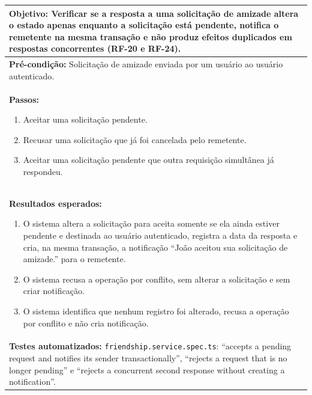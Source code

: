 \FloatBarrier
\begin{quadro}[h!]
\caption{Caso de teste CT07: validar a resposta a uma solicitação de amizade}
\label{quad:ct07}
\begin{tabular}{|p{\dimexpr\linewidth-2\tabcolsep-2\arrayrulewidth\relax}|}
\hline
\textbf{Objetivo:} Verificar se a resposta a uma solicitação de amizade altera o estado apenas enquanto a solicitação está pendente, notifica o remetente na mesma transação e não produz efeitos duplicados em respostas concorrentes (RF-20 e RF-24). \\ \hline
\textbf{Pré-condição:} Solicitação de amizade enviada por um usuário ao usuário autenticado. \\ \hline
\textbf{Passos:}
\begin{enumerate}[nosep,leftmargin=1.2em,topsep=2pt,partopsep=0pt,parsep=0pt,itemsep=1pt]
  \item Aceitar uma solicitação pendente.
  \item Recusar uma solicitação que já foi cancelada pelo remetente.
  \item Aceitar uma solicitação pendente que outra requisição simultânea já respondeu.
\end{enumerate} \\ \hline
\textbf{Resultados esperados:}
\begin{enumerate}[nosep,leftmargin=1.2em,topsep=2pt,partopsep=0pt,parsep=0pt,itemsep=1pt]
  \item O sistema altera a solicitação para aceita somente se ela ainda estiver pendente e destinada ao usuário autenticado, registra a data da resposta e cria, na mesma transação, a notificação ``João aceitou sua solicitação de amizade.'' para o remetente.
  \item O sistema recusa a operação por conflito, sem alterar a solicitação e sem criar notificação.
  \item O sistema identifica que nenhum registro foi alterado, recusa a operação por conflito e não cria notificação.
\end{enumerate} \\ \hline
\textbf{Testes automatizados:} \texttt{friendship.service.spec.ts}: ``accepts a pending request and notifies its sender transactionally'', ``rejects a request that is no longer pending'' e ``rejects a concurrent second response without creating a notification''. \\ \hline
\end{tabular}
\end{quadro}

